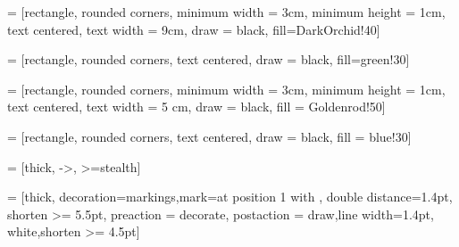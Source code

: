 \makeatletter
\newcommand*{\rom}[1]{\expandafter\@slowromancap\romannumeral #1@}
\makeatother

 = [rectangle, rounded corners, minimum width = 3cm, minimum height = 1cm, text centered, text width = 9cm, draw = black, fill=DarkOrchid!40]

 = [rectangle, rounded corners, text centered, draw = black, fill=green!30]

 = [rectangle, rounded corners, minimum width = 3cm, minimum height = 1cm, text centered, text width = 5 cm, draw = black, fill = Goldenrod!50]

 = [rectangle, rounded corners, text centered, draw = black, fill = blue!30]

 = [thick, ->, >=stealth]

 = [thick, decoration={markings,mark=at position
   1 with {}},
   double distance=1.4pt, shorten >= 5.5pt,
   preaction = {decorate},
   postaction = {draw,line width=1.4pt, white,shorten >= 4.5pt}]



